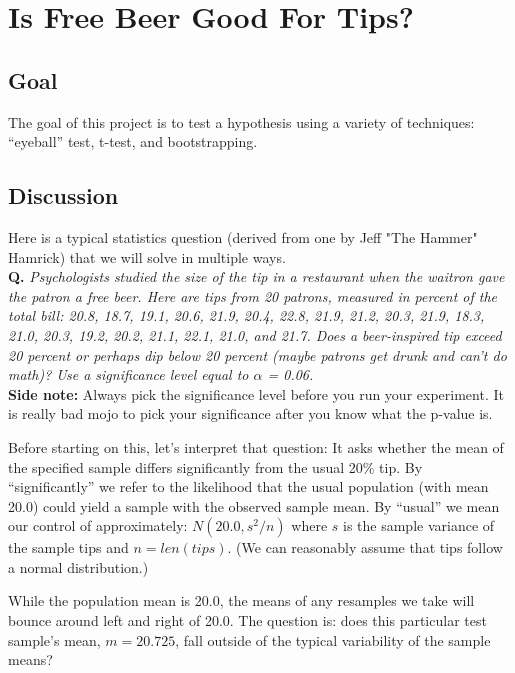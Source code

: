 \documentclass[titlepage]{tufte-book}
\newcounter{problem}
\newcounter{total}
\begin{document}
\chapter{Is Free Beer Good For Tips?}

\setcounter{problem}{1}
\section{Goal}

\begin{fullwidth}

The goal of this project is to test a hypothesis using a variety of techniques: ``eyeball'' test, t-test, and bootstrapping. 

\section{Discussion}

Here is a typical statistics question (derived from one by Jeff "The Hammer" Hamrick) that we will solve in multiple ways.\\

{\bf Q.} {\em Psychologists studied the size of the tip in a restaurant when the waitron gave the patron a free beer. Here are tips from 20 patrons, measured in percent of the total bill: 20.8, 18.7, 19.1, 20.6, 21.9, 20.4, 22.8,
        21.9, 21.2, 20.3, 21.9, 18.3, 21.0, 20.3,
        19.2, 20.2, 21.1, 22.1, 21.0, and 21.7. Does a beer-inspired tip exceed 20 percent or perhaps dip below 20 percent (maybe patrons get drunk and can't do math)? Use a significance level equal to $\alpha$ = 0.06.}\\
        
{\bf Side note:} Always pick the significance level before you run your experiment. It is really bad mojo to pick your significance after you know what the p-value is.

Before starting on this, let's interpret that question: It asks whether the mean of the specified sample differs significantly from the usual 20\% tip. By ``significantly'' we refer to the likelihood that the usual population (with mean 20.0) could yield a sample with the observed sample mean. By ``usual'' we mean our control of approximately: $N(20.0, s^2/n)$ where $s$ is the sample variance of the sample tips and $n=len(tips)$. (We can reasonably assume  that tips follow a normal distribution.)

While the population mean is 20.0, the means of any resamples we take will bounce around left and right of 20.0.  The question is: does this particular test sample's mean, $m=20.725$, fall outside of the typical variability of the sample means?


\end{fullwidth}
\end{document}
